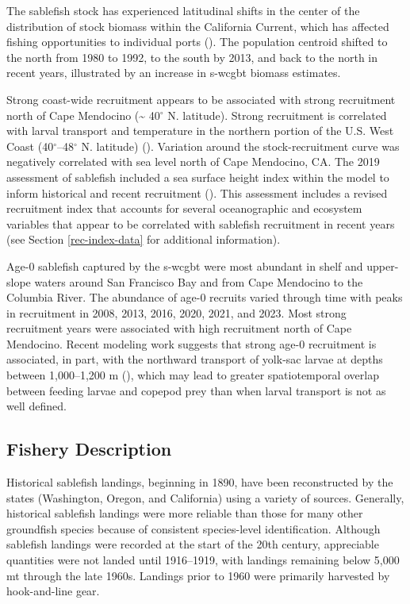 \documentclass[
  english,
]{article}
\begin{document}
The sablefish stock has experienced latitudinal shifts in the center of
the distribution of stock biomass within the California Current, which
has affected fishing opportunities to individual ports
(). The population
centroid shifted to the north from 1980 to 1992, to the south by 2013,
and back to the north in recent years, illustrated by an increase in
\gls{s-wcgbt} biomass estimates.

Strong coast-wide recruitment appears to be associated with strong
recruitment north of Cape Mendocino (\textasciitilde{} 40\(^\circ\) N.
latitude). Strong recruitment is correlated with larval transport and
temperature in the northern portion of the U.S. West Coast
(40\(^\circ\)--48\(^\circ\) N. latitude)
().
Variation around the stock-recruitment curve was negatively correlated
with sea level north of Cape Mendocino, CA. The 2019 assessment of
sablefish included a sea surface height index within the model to inform
historical and recent recruitment
(). This
assessment includes a revised recruitment index that accounts for
several oceanographic and ecosystem variables that appear to be
correlated with sablefish recruitment in recent years (see Section
\ref{rec-index-data} for additional information).

Age-0 sablefish captured by the \gls{s-wcgbt} were most abundant in
shelf and upper-slope waters around San Francisco Bay and from Cape
Mendocino to the Columbia River. The abundance of age-0 recruits varied
through time with peaks in recruitment in 2008, 2013, 2016, 2020, 2021,
and 2023. Most strong recruitment years were associated with high
recruitment north of Cape Mendocino. Recent modeling work suggests that
strong age-0 recruitment is associated, in part, with the northward
transport of yolk-sac larvae at depths between 1,000--1,200 m
(),
which may lead to greater spatiotemporal overlap between feeding larvae
and copepod prey than when larval transport is not as well defined.

\subsection{Fishery Description}\label{fishery-description}

Historical sablefish landings, beginning in 1890, have been
reconstructed by the states (Washington, Oregon, and California) using a
variety of sources. Generally, historical sablefish landings were more
reliable than those for many other groundfish species because of
consistent species-level identification. Although sablefish landings
were recorded at the start of the 20th century, appreciable quantities
were not landed until 1916--1919, with landings remaining below 5,000 mt
through the late 1960s. Landings prior to 1960 were primarily harvested
by hook-and-line gear.
\end{document}
